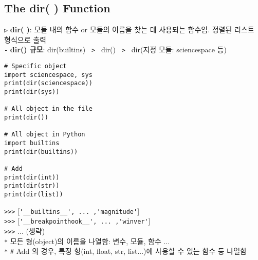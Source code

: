 \documentclass[11pt,a4paper]{article}
\begin{document}
\subsection{\Large\textbf{The dir( ) Function}}
\begin{spacing}{1.5}
\texttt{▷} \textbf{dir( )}: 모듈 내의 함수 or 모듈의 이름을 찾는 데 사용되는 함수임. 정렬된 리스트 형식으로 출력\\
\texttt{-} \textbf{dir() 규모}: dir(builtins) \texttt{ > }  dir() \texttt{ > } dir(지정 모듈: sciencespace 등)
\begin{lstlisting}[label={list:first}]
# Specific object
import sciencespace, sys
print(dir(sciencespace))
print(dir(sys))

# All object in the file
print(dir())

# All object in Python
import builtins
print(dir(builtins))

# Add
print(dir(int))
print(dir(str))
print(dir(list))
\end{lstlisting}
\verb|>>>| [\verb|'__builtins__', ... ,'magnitude'|]\\
\verb|>>>| [\verb|'__breakpointhook__', ... ,'winver'|]\\
\verb|>>>| ... (생략)\\

\hspace*{3em} \verb|*| 모든 형(object)의 이름을 나열함: 변수, 모듈, 함수 ...\\
\hspace*{3em} \verb|*| \verb|#| Add 의 경우, 특정 형(int, float, str, list...)에 사용할 수 있는 함수 등 나열함
\end{spacing}\\
\end{document}
